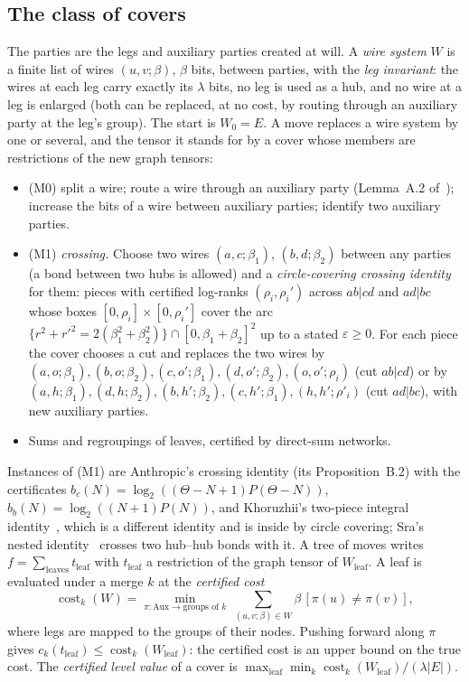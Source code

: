 \documentclass[10pt]{amsart}
\theoremstyle{plain}
\theoremstyle{definition}
\theoremstyle{remark}
\numberwithin{equation}{section}
\newcommand{\cost}{\operatorname{cost}}
\newcommand{\eps}{\varepsilon}
\begin{document}
\subsection{The class of covers}\label{sec:class}
The parties are the legs and auxiliary parties created at will. A \emph{wire system} $W$ is a finite list
of wires $(u,v;\beta)$, $\beta$ bits, between parties, with the \emph{leg invariant}: the wires at each
leg carry exactly its $\lambda$ bits, no leg is used as a hub, and no wire at a leg is enlarged (both can be
replaced, at no cost, by routing through an auxiliary party at the leg's group). The start is $W_0=E$.
A move replaces a wire system by one or several, and the tensor it stands for by a cover whose members
are restrictions of the new graph tensors:
\begin{itemize}
\item (M0) split a wire; route a wire through an auxiliary party (Lemma~A.2 of~\cite{AnthropicVP});
increase the bits of a wire between auxiliary parties; identify two auxiliary parties.
\item (M1) \emph{crossing.} Choose two wires $(a,c;\beta_1)$, $(b,d;\beta_2)$ between any parties
(a bond between two hubs is allowed) and a \emph{circle-covering crossing identity} for them: pieces
with certified log-ranks $(\rho_i,\rho_i')$ across $ab|cd$ and $ad|bc$ whose boxes $[0,\rho_i]\times[0,\rho_i']$
cover the arc $\{r^2+r'^2=2(\beta_1^2+\beta_2^2)\}\cap[0,\beta_1+\beta_2]^2$ up to a stated $\eps\ge0$. For
each piece the cover chooses a cut and replaces the two wires by
$(a,o;\beta_1),(b,o;\beta_2),(c,o';\beta_1),(d,o';\beta_2),(o,o';\rho_i)$ (cut $ab|cd$) or by
$(a,h;\beta_1),(d,h;\beta_2),(b,h';\beta_2),(c,h';\beta_1),(h,h';\rho'_i)$ (cut $ad|bc$), with new auxiliary
parties.
\item Sums and regroupings of leaves, certified by direct-sum networks.
\end{itemize}
Instances of (M1) are Anthropic's crossing identity (its Proposition~B.2) with the certificates
$b_c(N)=\log_2((\Theta-N+1)P(\Theta-N))$, $b_b(N)=\log_2((N+1)P(N))$, and Khoruzhii's two-piece integral
identity~\cite{Kho26}, which is a different identity and is inside by circle covering; Sra's nested
identity~\cite[Lemma~4.2]{Sra26} crosses two hub--hub bonds with it. A tree of moves writes
$f=\sum_{\text{leaves}}t_{\text{leaf}}$ with $t_{\text{leaf}}$ a restriction of the graph tensor of
$W_{\text{leaf}}$. A leaf is evaluated under a merge $k$ at the \emph{certified cost}
\begin{equation}\label{eq:certcost}
\cost_k(W)=\min_{\pi:\mathrm{Aux}\to\text{groups of }k}\ \sum_{(u,v;\beta)\in W}\beta\,[\pi(u)\ne\pi(v)],
\end{equation}
where legs are mapped to the groups of their nodes. Pushing forward along $\pi$ gives
$c_k(t_{\text{leaf}})\le\cost_k(W_{\text{leaf}})$: the certified cost is an upper bound on the true cost. The
\emph{certified level value} of a cover is $\max_{\text{leaf}}\min_k\cost_k(W_{\text{leaf}})/(\lambda|E|)$.
\end{document}
